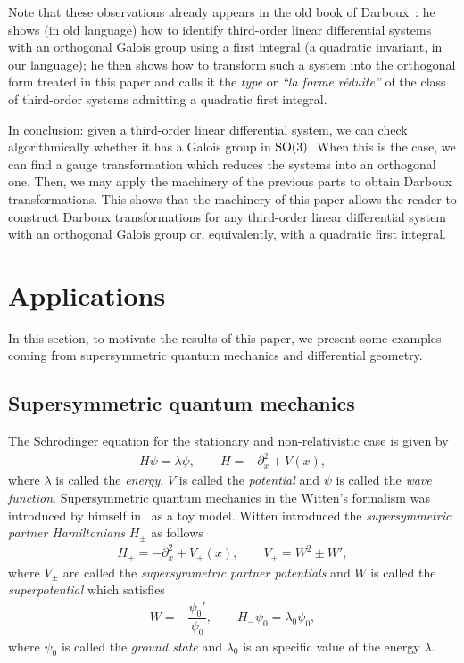 \documentclass[10pt,a4paper]{amsart}
\numberwithin{equation}{section}
\begin{document}
Note that these observations already appears in the old book of Darboux~\cite[p.~28--29]{da3}: he shows (in old language) how to identify third-order linear differential systems with an orthogonal Galois group using a first integral (a quadratic invariant, in our language); he then shows how to transform such a system into the orthogonal form treated in this paper and calls it the \emph{type} or 	\emph{``la forme r\'eduite''} of the class of third-order systems admitting a quadratic first integral.

In conclusion: given a third-order linear differential system, we can check algorithmically whether it has a Galois group in ${\rm SO}(3)$. When this is the case, we can find a gauge transformation which reduces the systems into an orthogonal one. Then, we may apply the machinery of the previous parts to obtain Darboux transformations. This shows that the machinery of this paper allows the reader to construct Darboux transformations for any third-order linear differential system with an orthogonal Galois group or, equivalently, with a quadratic first integral.

\section{Applications}\label{applications}
In this section, to motivate the results of this paper, we present some examples coming from supersymmetric quantum mechanics and differential geometry.

\subsection{Supersymmetric quantum mechanics}\label{sec:SUSY}

The Schr\"odinger equation for the stationary and non-relativistic case is given by
\begin{gather*}
H\psi=\lambda \psi,\qquad H=-\partial_x^2 +V(x),
\end{gather*}
where $\lambda$ is called the \emph{energy}, $V$ is called the \emph{potential} and $\psi$ is called the \emph{wave function}. Supersymmetric quantum mechanics in the Witten's formalism was introduced by himself in~\cite[Section~6]{wi} as a toy model. Witten introduced the \emph{supersymmetric partner Hamiltonians} $H_\pm$ as follows
\begin{gather*}
H_\pm=- \partial_x^2 +V_\pm(x),\qquad V_\pm=W^2\pm W',
\end{gather*}
where $V_\pm$ are called the \emph{supersymmetric partner potentials} and $W$ is called the \emph{superpotential} which satisfies
\begin{gather*}
W=-\dfrac{\psi_0'}{\psi_0},\qquad H_-\psi_0=\lambda_0\psi_0,
\end{gather*}
where $\psi_0$ is called the \emph{ground state} and $\lambda_0$ is an specific value of the energy $\lambda$.
\end{document}

